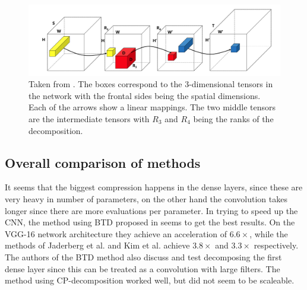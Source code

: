\begin{figure}
    \centering
    \includegraphics[width=\linewidth]{Pics/03_Previous_work/tuckerDecomp.png}
    \captionsetup{width=.95\linewidth}
    \caption{Taken from \cite{Kim2016}. The boxes correspond to the 3-dimensional tensors in the network with the frontal sides being the spatial dimensions. Each of the arrows show a linear mappings. The two middle tensors are the intermediate tensors with $R_3$ and $R_4$ being the ranks of the decomposition.}
    \label{fig:tuckerDecompConv}
\end{figure}

\subsection{Overall comparison of methods}
It seems that the biggest compression happens in the dense layers, since these are very heavy in number of parameters, on the other hand the convolution takes longer since there are more evaluations per parameter. In trying to speed up the CNN, the method using BTD proposed in \cite{Wang2016} seems to get the best results. On the VGG-16 network architecture\cite{Simonyan2015} they achieve an acceleration of $6.6 \times$, while the methods of Jaderberg et al. \cite{Jaderberg2014} and Kim et al. \cite{Kim2016} achieve $3.8 \times$ and $3.3\times$ respectively. The authors of the BTD method also discuss and test decomposing the first dense layer since this can be treated as a convolution with large filters. The method using CP-decomposition \cite{Lebedev2015} worked well, but did not seem to be scaleable.

